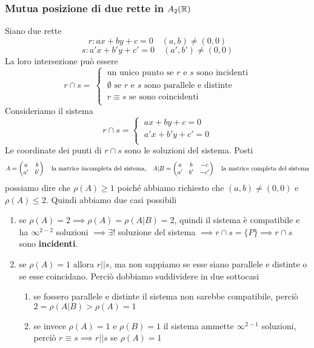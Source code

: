 \documentclass[twoside]{report}
\begin{document}
\subsubsection{Mutua posizione di due rette in \(A_2(\RR )\)}
Siano due rette \[
r: ax + by + c = 0 \quad (a,b) \neq (0,0)
\] \[
s: a'x + b'y + c' = 0 \quad (a', b') \neq (0,0)
\]
La loro intersezione può essere \[ r \cap s = \
\begin{cases}
    \ \text{un unico punto se \(r\) e \(s\) sono incidenti} \\
    \ \emptyset \text{ se \(r\) e \(s\) sono parallele e distinte} \\
    \ r \equiv s \text{ se sono coincidenti } \\
\end{cases}
\]
Consideriamo il sistema \[r \cap s=
\begin{cases}
    \ ax + by + c = 0 \\
    \ a'x + b'y + c' = 0 \\
\end{cases}
\]
Le coordinate dei punti di \(r \cap s\) sono le soluzioni del sistema. Posti \[
A =
\left( \; \\
 \begin{matrix}
    a & b \\
    a' & b' \\
\end{matrix} \; \\
 \right) \quad \text{la matrice incompleta del sistema,}
 \quad A|B =
\left( \; \\
 \begin{matrix}
    a & b & -c \\
    a' & b' & -c' \\
\end{matrix} \; \\
 \right) \quad \text{la matrice completa del sistema}
\] possiamo dire che \(\rho(A) \ge 1\) poiché abbiamo richiesto che \((a,b) \neq (0,0)\) e \(\rho(A) \le 2\). Quindi abbiamo due casi possibili
\begin{enumerate}
    \item se \(\rho(A) = 2 \implies \rho(A) = \rho(A|B) =2\), quindi il sistema è compatibile e ha \(\infty^{2-2}\) soluzioni \(\implies \exists !\) soluzione del sistema \(\implies r \cap s = \{P\} \implies r \cap s\) sono \textbf{incidenti}.
    \item se \(\rho(A) = 1\) allora \(r || s\), ma non sappiamo se esse siano parallele e distinte o se esse coincidano. Perciò dobbiamo suddividere in due sottocasi
        \begin{enumerate}
            \item se fossero parallele e distinte il sistema non sarebbe compatibile, perciò \(2= \rho(A|B) > \rho(A) = 1\)
            \item se invece \(\rho(A) = 1\) e \(\rho(B) = 1\) il sistema ammette \(\infty^{2-1}\) soluzioni, perciò \(r \equiv s \implies r||s\) se \(\rho(A) = 1\)
        \end{enumerate}
\end{enumerate}
\end{document}
